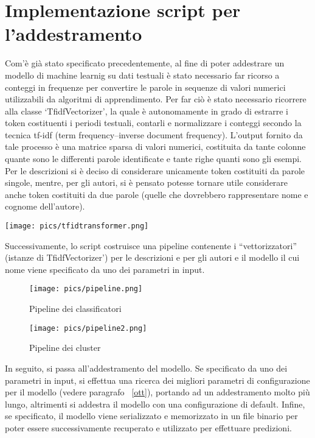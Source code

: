 \documentclass[12pt,oneside]{article}
\begin{document}
\section{Implementazione script per l'addestramento}
    \begin{justify}
        Com’è già stato specificato precedentemente, al fine di poter addestrare un modello di machine learnig su dati testuali è stato necessario far ricorso a conteggi in frequenze per convertire le parole in sequenze di valori numerici utilizzabili da algoritmi di apprendimento. Per far ciò è stato necessario ricorrere alla classe ‘TfidfVectorizer’, la quale è autonomamente in grado di estrarre i token costituenti i periodi testuali, contarli e normalizzare i conteggi secondo la tecnica tf-idf (term frequency–inverse document frequency). L’output fornito  da tale processo è una matrice sparsa di valori numerici, costituita da tante colonne quante sono le differenti parole identificate e tante righe quanti sono gli esempi. Per le descrizioni si è deciso di considerare unicamente token costituiti da parole singole, mentre, per gli autori, si è pensato potesse tornare utile considerare anche token costituiti da due parole (quelle che dovrebbero rappresentare nome e cognome dell’autore).
        \end{justify}

        \texttt{[image: pics/tfidtransformer.png]}
        
        \begin{justify}
        Successivamente, lo script costruisce una pipeline contenente i “vettorizzatori” (istanze di TfidfVectorizer’) per le descrizioni e per gli autori e il modello il cui nome viene specificato da uno dei parametri in input.
        \end{justify}

        \begin{figure}[H]
        \texttt{[image: pics/pipeline.png]}
        \caption{Pipeline dei classificatori}
        \end{figure}

        \begin{figure}[H]
        \texttt{[image: pics/pipeline2.png]}
        \caption{Pipeline dei cluster}
        \end{figure}
        
        \begin{justify}
        In seguito, si passa all’addestramento del modello. Se specificato da uno dei parametri in input, si effettua una ricerca dei migliori parametri di configurazione per il modello (vedere paragrafo ~\ref{ott}), portando ad un addestramento molto più lungo, altrimenti si addestra il modello con una configurazione di default. Infine, se specificato, il modello viene serializzato e memorizzato in un file binario per poter essere successivamente recuperato e utilizzato per effettuare predizioni.
    \end{justify}
    
\end{document}
